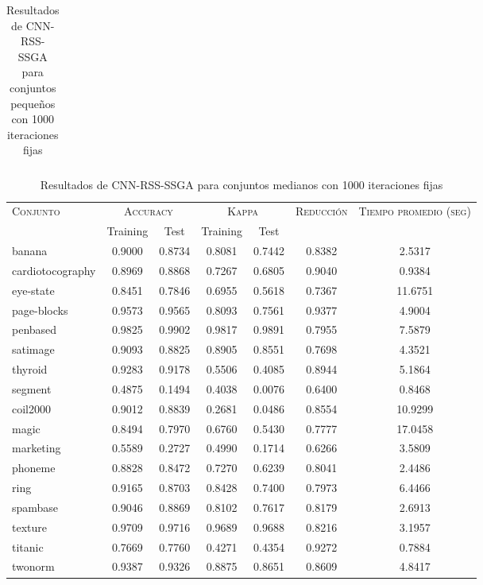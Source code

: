 \begin{table}[]
\begin{tabular}{l c c c c c c}
\hline
\end{tabular}
\caption{Resultados de CNN-RSS-SSGA para conjuntos pequeños con 1000 iteraciones fijas}
\label{res-peq-CNN-RSS-ssga}
\end{table}


\begin{table}[]
\centering
\begin{tabular}{l c c c c c c}
\hline
\multirow{2}{*}{\textsc{Conjunto}}
	& \multicolumn{2}{c}{\textsc{Accuracy}}
	& \multicolumn{2}{c}{\textsc{Kappa}}
	& \textsc{Reducción}
	& \textsc{Tiempo promedio (seg)} \\
	& Training & Test
	& Training & Test \\ 
\hline
\hline

banana & 0.9000 & 0.8734 & 0.8081 & 0.7442 & 0.8382 & 2.5317 \\
cardiotocography & 0.8969 & 0.8868 & 0.7267 & 0.6805 & 0.9040 & 0.9384 \\
eye-state & 0.8451 & 0.7846 & 0.6955 & 0.5618 & 0.7367 & 11.6751 \\
page-blocks & 0.9573 & 0.9565 & 0.8093 & 0.7561 & 0.9377 & 4.9004 \\
penbased & 0.9825 & 0.9902 & 0.9817 & 0.9891 & 0.7955 & 7.5879 \\
satimage & 0.9093 & 0.8825 & 0.8905 & 0.8551 & 0.7698 & 4.3521 \\
thyroid & 0.9283 & 0.9178 & 0.5506 & 0.4085 & 0.8944 & 5.1864 \\
segment & 0.4875 & 0.1494 & 0.4038 & 0.0076 & 0.6400 & 0.8468 \\
coil2000 & 0.9012 & 0.8839 & 0.2681 & 0.0486 & 0.8554 & 10.9299 \\
magic & 0.8494 & 0.7970 & 0.6760 & 0.5430 & 0.7777 & 17.0458 \\
marketing & 0.5589 & 0.2727 & 0.4990 & 0.1714 & 0.6266 & 3.5809 \\
phoneme & 0.8828 & 0.8472 & 0.7270 & 0.6239 & 0.8041 & 2.4486 \\
ring & 0.9165 & 0.8703 & 0.8428 & 0.7400 & 0.7973 & 6.4466 \\
spambase & 0.9046 & 0.8869 & 0.8102 & 0.7617 & 0.8179 & 2.6913 \\
texture & 0.9709 & 0.9716 & 0.9689 & 0.9688 & 0.8216 & 3.1957 \\
titanic & 0.7669 & 0.7760 & 0.4271 & 0.4354 & 0.9272 & 0.7884 \\
twonorm & 0.9387 & 0.9326 & 0.8875 & 0.8651 & 0.8609 & 4.8417 \\

\hline
\end{tabular}
\caption{Resultados de CNN-RSS-SSGA para conjuntos medianos con 1000 iteraciones fijas}
\label{res-med-CNN-RSS-ssga}
\end{table}


